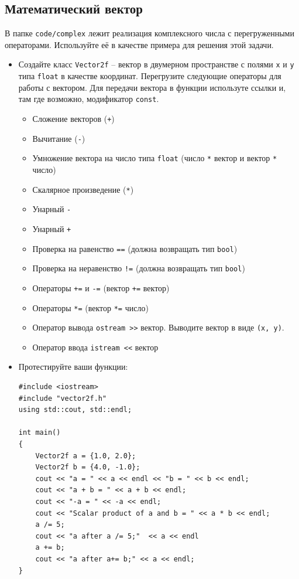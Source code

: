 \documentclass{article}
\begin{document}
\subsection{Математический вектор}
В папке \texttt{code/complex} лежит реализация комплексного числа с перегруженными операторами. Используйте её в качестве примера для решения этой задачи.
\begin{itemize}
\item Создайте класс \texttt{Vector2f} -- вектор в двумерном пространстве с полями \texttt{x} и \texttt{y} типа \texttt{float} в качестве координат. Перегрузите следующие операторы для работы с вектором. Для передачи вектора в функции используте ссылки и, там где возможно, модификатор \texttt{const}.
\begin{itemize}
\item Сложение векторов (\texttt{+})
\item Вычитание (\texttt{-})
\item Умножение вектора на число типа \texttt{float} (число \texttt{*} вектор и вектор \texttt{*} число)
\item Скалярное произведение (\texttt{*})
\item Унарный \texttt{-}
\item Унарный \texttt{+}
\item Проверка на равенство \texttt{==}  (должна возвращать тип \texttt{bool})
\item Проверка на неравенство \texttt{!=}  (должна возвращать тип \texttt{bool})
\item Операторы \texttt{+=} и \texttt{-=}  (вектор \texttt{+=} вектор)
\item Операторы \texttt{*=}  (вектор \texttt{*=} число)
\item Оператор вывода  \texttt{ostream >{}>} вектор. Выводите вектор в виде \texttt{(x, y)}.
\item Оператор ввода  \texttt{istream <{}<} вектор
\end{itemize}
\item Протестируйте ваши функции:
\begin{lstlisting}
#include <iostream>
#include "vector2f.h"
using std::cout, std::endl;

int main() 
{
	Vector2f a = {1.0, 2.0};
	Vector2f b = {4.0, -1.0};
	cout << "a = " << a << endl << "b = " << b << endl;
	cout << "a + b = " << a + b << endl;
	cout << "-a = " << -a << endl;
	cout << "Scalar product of a and b = " << a * b << endl;
	a /= 5;
	cout << "a after a /= 5;"  << a << endl
	a += b;
	cout << "a after a+= b;" << a << endl;
}
\end{lstlisting}

\end{itemize}
\end{document}
